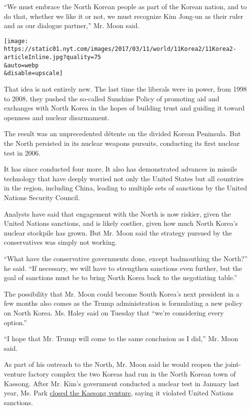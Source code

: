 ``We must embrace the North Korean people as part of the Korean nation,
and to do that, whether we like it or not, we must recognize Kim Jong-un
as their ruler and as our dialogue partner,'' Mr. Moon said.

\texttt{[image: https://static01.nyt.com/images/2017/03/11/world/11Korea2/11Korea2-articleInline.jpg?quality=75\\\&auto=webp\\\&disable=upscale]}

That idea is not entirely new. The last time the liberals were in power,
from 1998 to 2008, they pushed the so-called Sunshine Policy of
promoting aid and exchanges with North Korea in the hopes of building
trust and guiding it toward openness and nuclear disarmament.

The result was an unprecedented détente on the divided Korean Peninsula.
But the North persisted in its nuclear weapons pursuits, conducting its
first nuclear test in 2006.

It has since conducted four more. It also has demonstrated advances in
missile technology that have deeply worried not only the United States
but all countries in the region, including China, leading to multiple
sets of sanctions by the United Nations Security Council.

Analysts have said that engagement with the North is now riskier, given
the United Nations sanctions, and is likely costlier, given how much
North Korea's nuclear stockpile has grown. But Mr. Moon said the
strategy pursued by the conservatives was simply not working.

``What have the conservative governments done, except badmouthing the
North?'' he said. ``If necessary, we will have to strengthen sanctions
even further, but the goal of sanctions must be to bring North Korea
back to the negotiating table.''

The possibility that Mr. Moon could become South Korea's next president
in a few months also comes as the Trump administration is formulating a
new policy on North Korea. Ms. Haley said on Tuesday that ``we're
considering every option.''

``I hope that Mr. Trump will come to the same conclusion as I did,'' Mr.
Moon said.

As part of his outreach to the North, Mr. Moon said he would reopen the
joint-venture factory complex the two Koreas had run in the North Korean
town of Kaesong. After Mr. Kim's government conducted a nuclear test in
January last year, Ms. Park
\href{https://www.nytimes.com/2016/02/11/world/asia/north-south-korea-kaesong.html}{closed
the Kaesong venture}, saying it violated United Nations sanctions.


